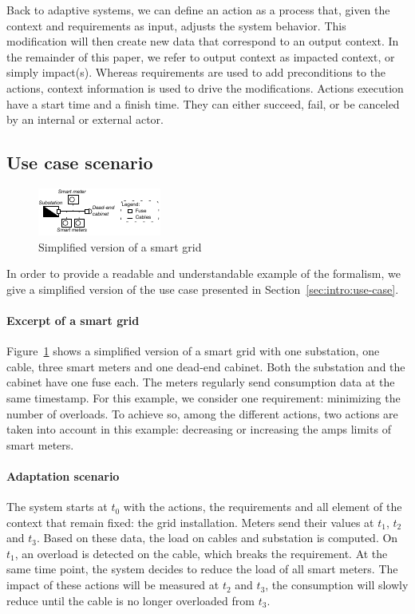 Back to adaptive systems, we can define an action as a process that, given the context and requirements as input, adjusts the system behavior.
This modification will then create new data that correspond to an output context. In the remainder of this paper, we refer to output context as impacted context, or simply impact(s).
Whereas requirements are used to add preconditions to the actions, context information is used to drive the modifications.
Actions execution have a start time and a finish time. They can either succeed, fail, or be canceled by an internal or external actor.


\subsection{Use case scenario}
\label{sec:tkm:intro:uc}

\begin{figure}
	\centering
	\includegraphics[width=0.5\linewidth]{img/chapt-tkm/formalism/excerptSG}
	\caption{Simplified version of a smart grid}
	\label{fig:tkm:excerptSG}
\end{figure}

In order to provide a readable and understandable example of the formalism, we give a simplified version of the use case presented in Section~\ref{sec:intro:use-case}.

\paragraph{Excerpt of a smart grid}
Figure~\ref{fig:tkm:excerptSG} shows a simplified version of a smart grid with one substation, one cable, three smart meters and one dead-end cabinet.
Both the substation and the cabinet have one fuse each.
The meters regularly send consumption data at the same timestamp.
For this example, we consider one requirement: minimizing the number of overloads.
To achieve so, among the different actions, two actions are taken into account in this example: decreasing or increasing the amps limits of smart meters.

\paragraph{Adaptation scenario}
The system starts at $t_0$ with the actions, the requirements and all element of the context that remain fixed: the grid installation.
Meters send their values at $t_1$, $t_2$ and $t_3$.
Based on these data, the load on cables and substation is computed.
On $t_1$, an overload is detected on the cable, which breaks the requirement.
At the same time point, the system decides to reduce the load of all smart meters.
The impact of these actions will be measured at $t_2$ and $t_3$, \ie the consumption will slowly reduce until the cable is no longer overloaded from $t_3$.

